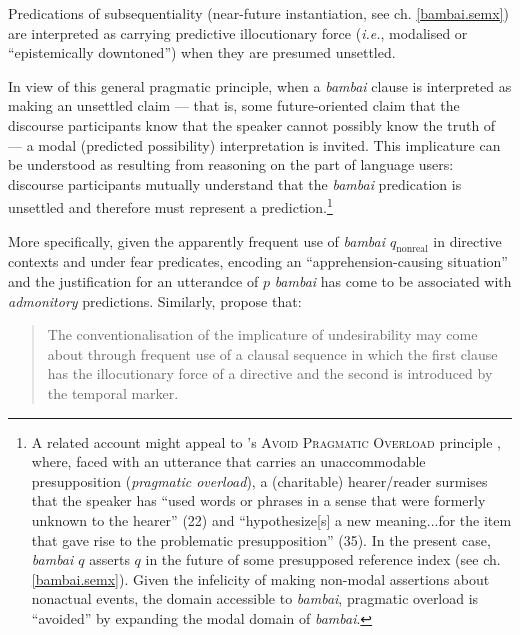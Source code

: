Predications of subsequentiality (near-future instantiation, see ch. \ref{bambai.semx}) are interpreted as carrying predictive illocutionary force (\textit{i.e.}, modalised or ``epistemically downtoned'') when they are presumed unsettled.
  \xe
  
In view of this general pragmatic principle, when a \textit{bambai} clause is interpreted as making an unsettled claim --- that is, some future-oriented claim that the discourse participants know that the speaker cannot possibly know the truth of --- a modal (predicted possibility) interpretation is invited. This implicature can be understood as resulting from reasoning on the part of language users: discourse participants mutually understand that the \textit{bambai} predication is unsettled and therefore must represent a prediction.\footnote{A related account might appeal to \citeauthor{Eckardt2009}'s \textsc{Avoid Pragmatic Overload} principle \citeyearpar{Eckardt2009}, where, faced with an utterance that carries an unaccommodable presupposition (\textit{pragmatic overload}), a (charitable) hearer/reader surmises that the speaker has ``used words or phrases in a sense that were formerly unknown to the hearer'' (22) and ``hypothesize[s] a new meaning...for the item that gave rise to the problematic presupposition'' (35). In the present case, \textit{bambai $ q $} asserts $ q $ in the future of some presupposed reference index (see ch. \ref{bambai.semx}). Given the infelicity of making non-modal assertions about nonactual events, the domain accessible to \textit{bambai}, pragmatic overload is ``avoided'' by expanding the modal domain of \textit{bambai}.}%


 More specifically, given the apparently frequent use of \textit{bambai $ q_{\text{nonreal}} $} in directive contexts and under fear predicates, encoding an ``apprehension-causing situation'' \citep[298]{Lichtenberk1995} and the justification for an utterandce of $ p $ \textit{bambai} has come to be associated with \textit{admonitory} predictions. Similarly, \citet[285]{Angelo2016} propose that:
 \begin{quote}
 	{\small
 		The conventionalisation of the implicature of undesirability may come about through frequent use of a clausal sequence in which the first clause has the illocutionary force of a directive and the second is introduced by the temporal marker.}\end{quote} 
 
